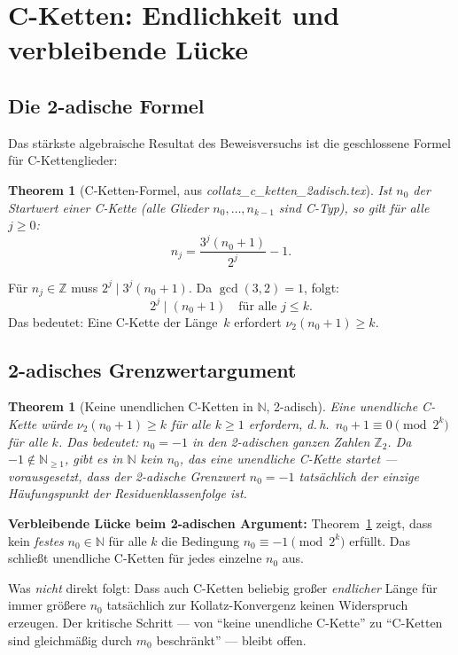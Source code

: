 \documentclass[12pt,a4paper]{article}
\newtheorem{theorem}[definition]{Theorem}
\newcommand{\vii}{\nu_2}
\newcommand{\N}{\mathbb{N}}
\newcommand{\Z}{\mathbb{Z}}
\newcommand{\Ztwo}{\mathbb{Z}_2}
\begin{document}
\section{C-Ketten: Endlichkeit und verbleibende Lücke}
\label{sec:cketten}

\subsection{Die 2-adische Formel}

Das stärkste algebraische Resultat des Beweisversuchs ist die geschlossene
Formel für C-Kettenglieder:

\begin{theorem}[C-Ketten-Formel, aus \textit{collatz\_c\_ketten\_2adisch.tex}]
\label{thm:cformel}
Ist $n_0$ der Startwert einer C-Kette (alle Glieder $n_0,\ldots,n_{k-1}$
sind C-Typ), so gilt für alle $j \geq 0$:
\[
  n_j = \frac{3^j(n_0+1)}{2^j} - 1.
\]
\end{theorem}

Für $n_j \in \Z$ muss $2^j \mid 3^j(n_0+1)$. Da $\gcd(3,2)=1$, folgt:
\[
  2^j \mid (n_0+1) \quad \text{für alle } j \leq k.
\]
Das bedeutet: Eine C-Kette der Länge~$k$ erfordert $\vii(n_0+1) \geq k$.

\subsection{2-adisches Grenzwertargument}

\begin{theorem}[Keine unendlichen C-Ketten in $\N$, 2-adisch]
\label{thm:2adisch}
Eine unendliche C-Kette würde $\vii(n_0+1) \geq k$ für \emph{alle} $k \geq 1$
erfordern, d.\,h.\ $n_0 + 1 \equiv 0 \pmod{2^k}$ für alle $k$.
Das bedeutet: $n_0 = -1$ in den 2-adischen ganzen Zahlen $\Ztwo$.
Da $-1 \notin \N_{\geq 1}$, gibt es in $\N$ kein $n_0$, das eine
unendliche C-Kette startet --- \emph{vorausgesetzt}, dass
der 2-adische Grenzwert $n_0 = -1$ tatsächlich der einzige
Häufungspunkt der Residuenklassenfolge ist.
\end{theorem}

\begin{tcolorbox}[lücke]
\textbf{Verbleibende Lücke beim 2-adischen Argument:}
Theorem~\ref{thm:2adisch} zeigt, dass kein \emph{festes} $n_0 \in \N$
für alle $k$ die Bedingung $n_0 \equiv -1 \pmod{2^k}$ erfüllt.
Das schließt unendliche C-Ketten für jedes einzelne $n_0$ aus.

Was \emph{nicht} direkt folgt: Dass auch C-Ketten beliebig großer
\emph{endlicher} Länge für immer größere $n_0$ tatsächlich
zur Kollatz-Konvergenz keinen Widerspruch erzeugen.
Der kritische Schritt --- von ``keine unendliche C-Kette''
zu ``C-Ketten sind gleichmäßig durch $m_0$ beschränkt'' --- bleibt offen.
\end{tcolorbox}
\end{document}
